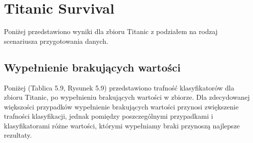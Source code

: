 \documentclass[oneside]{book}
\begin{document}
\section{Titanic Survival}

Poniżej przedstawiono wyniki dla 
zbioru Titanic z podziałem na rodzaj scenariusza przygotowania danych.

\subsection{Wypełnienie brakujących wartości}


Poniżej (Tablica 5.9, Rysunek 5.9) przedstawiono 
trafność klasyfikatorów dla zbioru Titanic, 
po wypełnieniu brakujących wartości w zbiorze.
Dla zdecydowanej większości przypadków wypełnienie brakujących wartości
przynosi zwiększenie trafności klasyfikacji, jednak pomiędzy poszczególnymi przypadkami 
i klasyfikatorami różne wartości, którymi wypełniamy braki przynoszą najlepsze
rezultaty.
\end{document}
